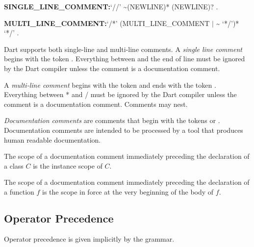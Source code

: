 \documentclass{article}
\begin{document}
\begin{grammar}
{\bf SINGLE\_LINE\_COMMENT:}`//' \~{}(NEWLINE)* (NEWLINE)?
  .

{\bf MULTI\_LINE\_COMMENT:}`/*' (MULTI\_LINE\_COMMENT $|$ \~{} `*/')* `*/'
  .
\end{grammar}

\LMHash{}
Dart supports both single-line and multi-line comments.
A {\em single line comment} begins with the token \code{//}.
Everything between \code{//} and the end of line must be ignored by the Dart compiler unless the comment is a documentation comment.

\LMHash{}
A {\em multi-line comment} begins with the token \code{/*} and ends with the token \code{*/}.
Everything between \code{/}* and \code{*}/ must be ignored by the Dart compiler unless the comment is a documentation comment.
Comments may nest.

\LMHash{}
{\em Documentation comments} are comments that begin with the tokens \code{///} or \code{/**}.
Documentation comments are intended to be processed by a tool that produces human readable documentation.

\LMHash{}
The scope of a documentation comment immediately preceding the declaration of a class $C$ is the instance scope of $C$.

\LMHash{}
The scope of a documentation comment immediately preceding the declaration of a function $f$ is the scope in force at the very beginning of the body of $f$.


\subsection{Operator Precedence}

\LMHash{}
Operator precedence is given implicitly by the grammar.
\end{document}
